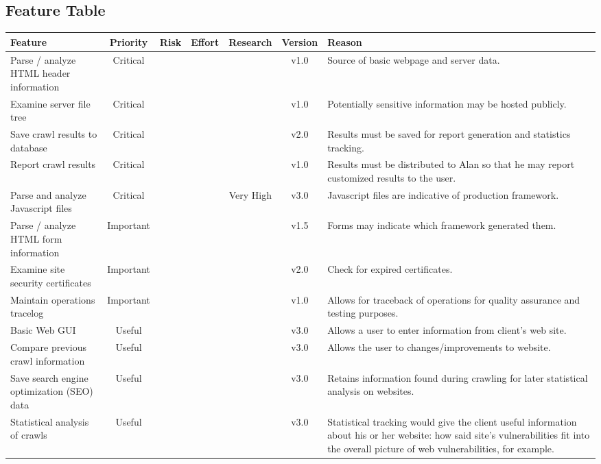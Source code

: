\subsection{Feature Table}
\begin{tabularx}{\textwidth}{|X|c|c|c|c|c|X|}
	\hline
	\bf Feature &\bf Priority &\bf Risk &\bf Effort &\bf Research &\bf Version &\bf Reason \\ \hline
	Parse / analyze HTML header information & Critical & \lw & \md & \md & v1.0 & Source of basic webpage and server data. \\ \hline
	Examine server file tree & Critical & \md & \lw & \lw & v1.0 & Potentially sensitive information may be hosted publicly. \\ \hline
	Save crawl results to database & Critical & \md & \hh & \lw &v2.0 & Results must be saved for report generation and statistics tracking. \\ \hline
	Report crawl results & Critical & \hh & \md & \md &v1.0 & Results must be distributed to Alan so that he may report customized results to the user. \\ \hline
	Parse and analyze Javascript files & Critical & \lw & \hh & Very High &v3.0 & Javascript files are indicative of production framework. \\ \hline
	Parse / analyze HTML form information & Important & \lw & \hh & \hh &v1.5  & Forms may indicate which framework generated them. \\ \hline
	Examine site security certificates & Important & \md & \lw & \md &v2.0 & Check for expired certificates. \\ \hline
	Maintain operations tracelog & Important & \hh & \lw & \lw &v1.0 & Allows for traceback of operations for quality assurance and testing purposes. \\ \hline
	Basic Web GUI & Useful & \lw & \lw & \lw &v3.0 & Allows a user to enter information from client's web site. \\ \hline
	Compare previous crawl information & Useful & \lw & \hh & \md &v3.0 & Allows the user to changes/improvements to website. \\ \hline
	Save search engine optimization (SEO) data & Useful & \lw & \lw & \md & v3.0 & Retains information found during crawling for later statistical analysis on websites. \\ \hline
	Statistical analysis of crawls & Useful & \md & \hh & \md &v3.0 & Statistical tracking would give the client useful information about his or her website: how said site's vulnerabilities fit into the overall picture of web vulnerabilities, for example. \\ \hline
\end{tabularx}
\newpage

